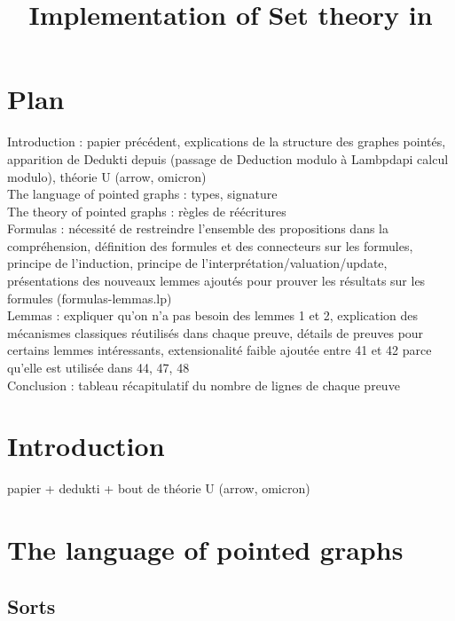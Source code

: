 \documentclass[a4paper]{article}
\title{Implementation of Set theory in \dedukti}
\date{}
\begin{document}
\thispagestyle{empty}
\maketitle


\section*{Plan}

Introduction : papier précédent, explications de la structure des graphes pointés, apparition de Dedukti depuis (passage de Deduction modulo à Lambpdapi calcul modulo), théorie U (arrow, omicron) \\

The language of pointed graphs : types, signature \\

The theory of pointed graphs : règles de réécritures \\

Formulas : nécessité de restreindre l'ensemble des propositions dans la compréhension, définition des formules et des connecteurs sur les formules, principe de l'induction, principe de l'interprétation/valuation/update, présentations des nouveaux lemmes ajoutés pour prouver les résultats sur les formules (formulas-lemmas.lp) \\

Lemmas : expliquer qu'on n'a pas besoin des lemmes 1 et 2, explication des mécanismes classiques réutilisés dans chaque preuve, détails de preuves pour certains lemmes intéressants, extensionalité faible ajoutée entre 41 et 42 parce qu'elle est utilisée dans 44, 47, 48 \\

Conclusion : tableau récapitulatif du nombre de lignes de chaque preuve

\section{Introduction}

papier + dedukti + bout de théorie U (arrow, omicron)

\section{The language of pointed graphs}

\subsection{Sorts}
\end{document}
